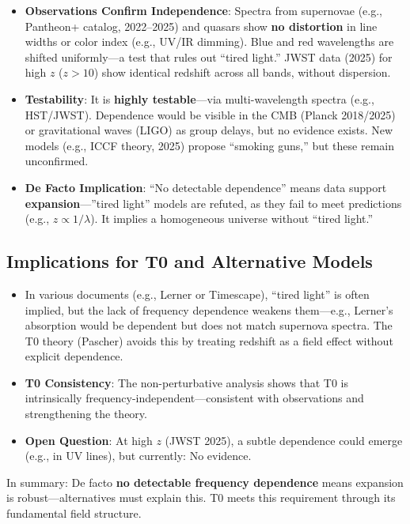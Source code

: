 	\begin{itemize}
		\item \textbf{Observations Confirm Independence}: Spectra from supernovae (e.g., Pantheon+ catalog, 2022–2025) and quasars show \textbf{no distortion} in line widths or color index (e.g., UV/IR dimming). Blue and red wavelengths are shifted uniformly—a test that rules out ``tired light.'' JWST data (2025) for high $z$ ($z>10$) show identical redshift across all bands, without dispersion.
		\item \textbf{Testability}: It is \textbf{highly testable}—via multi-wavelength spectra (e.g., HST/JWST). Dependence would be visible in the CMB (Planck 2018/2025) or gravitational waves (LIGO) as group delays, but no evidence exists. New models (e.g., ICCF theory, 2025) propose ``smoking guns,'' but these remain unconfirmed.
		\item \textbf{De Facto Implication}: ``No detectable dependence'' means data support \textbf{expansion}—''tired light'' models are refuted, as they fail to meet predictions (e.g., $z \propto 1/\lambda$). It implies a homogeneous universe without ``tired light.''
	\end{itemize}
	
	\subsection{Implications for T0 and Alternative Models}
	
	\begin{itemize}
		\item In various documents (e.g., Lerner or Timescape), ``tired light'' is often implied, but the lack of frequency dependence weakens them—e.g., Lerner’s absorption would be dependent but does not match supernova spectra. The T0 theory (Pascher) avoids this by treating redshift as a field effect without explicit dependence.
		\item \textbf{T0 Consistency}: The non-perturbative analysis shows that T0 is intrinsically frequency-independent—consistent with observations and strengthening the theory.
		\item \textbf{Open Question}: At high $z$ (JWST 2025), a subtle dependence could emerge (e.g., in UV lines), but currently: No evidence.
	\end{itemize}
	
	In summary: De facto \textbf{no detectable frequency dependence} means expansion is robust—alternatives must explain this. T0 meets this requirement through its fundamental field structure.
	
